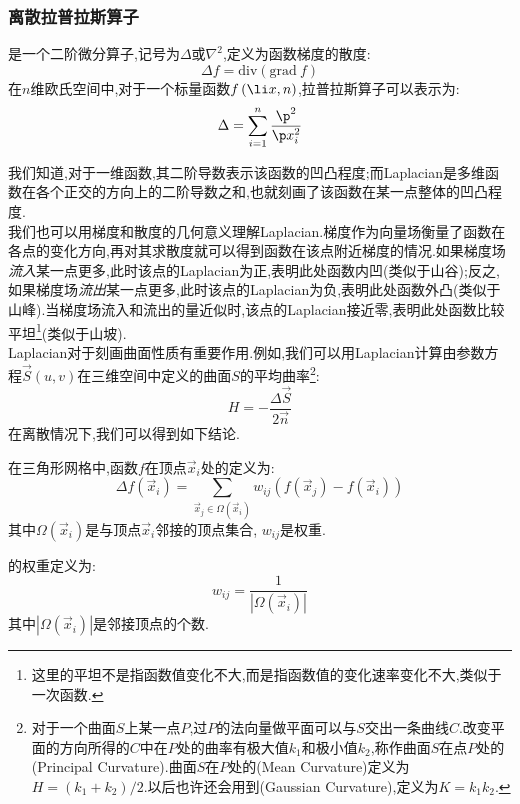 \documentclass{ctexart}
\begin{document}
\subsubsection{离散拉普拉斯算子}
\begin{definition}[拉普拉斯算子]
    是一个二阶微分算子,记号为$\Delta$或$\nabla^2$,定义为函数梯度的散度:
    \[\Delta f=\text{div}\left(\text{grad}\ f\right)\]
    在$n$维欧氏空间中,对于一个标量函数$f\left(\li x,n\right)$,拉普拉斯算子可以表示为:
    \[\Delta=\sum_{i=1}^{n}\dfrac{\p^2}{\p x_i^2}\]
\end{definition}
我们知道,对于一维函数,其二阶导数表示该函数的凹凸程度;而Laplacian是多维函数在各个正交的方向上的二阶导数之和,也就刻画了该函数在某一点整体的凹凸程度.\\
\indent 我们也可以用梯度和散度的几何意义理解Laplacian.梯度作为向量场衡量了函数在各点的变化方向,再对其求散度就可以得到函数在该点附近梯度的情况.如果梯度场\textit{流入}某一点更多,此时该点的Laplacian为正,表明此处函数内凹(类似于山谷);反之,如果梯度场\textit{流出}某一点更多,此时该点的Laplacian为负,表明此处函数外凸(类似于山峰).当梯度场流入和流出的量近似时,该点的Laplacian接近零,表明此处函数比较平坦\footnote{这里的平坦不是指函数值变化不大,而是指函数值的变化速率变化不大,类似于一次函数.}(类似于山坡).\\
\indent Laplacian对于刻画曲面性质有重要作用.例如,我们可以用Laplacian计算由参数方程$\vec{S}(u,v)$在三维空间中定义的曲面$S$的平均曲率\footnote{对于一个曲面$S$上某一点$P$,过$P$的法向量做平面可以与$S$交出一条曲线$C$.改变平面的方向所得的$C$中在$P$处的曲率有极大值$k_1$和极小值$k_2$,称作曲面$S$在点$P$处的(Principal Curvature).曲面$S$在$P$处的(Mean Curvature)定义为$H=\left(k_1+k_2\right)/2$.以后也许还会用到(Gaussian Curvature),定义为$K=k_1k_2$.}:
\[H=-\dfrac{\Delta\vec{S}}{2\vec{n}}\]
\indent 在离散情况下,我们可以得到如下结论.
\begin{definition}[离散拉普拉斯算子]
    在三角形网格中,函数$f$在顶点$\vec{x}_i$处的定义为:
    \[\Delta f\left(\vec{x}_i\right)=\sum_{\vec{x}_j\in\Omega(\vec{x}_i)}w_{ij}\left(f\left(\vec{x}_j\right)-f\left(\vec{x}_i\right)\right)\]
    其中$\Omega(\vec{x}_i)$是与顶点$\vec{x}_i$邻接的顶点集合, $w_{ij}$是权重.
\end{definition}
\begin{definition}[均匀拉普拉斯算子]
    的权重定义为:
    \[w_{ij}=\dfrac{1}{\left|\Omega(\vec{x}_i)\right|}\]
    其中$\left|\Omega(\vec{x}_i)\right|$是邻接顶点的个数.
\end{definition}
\end{document}
